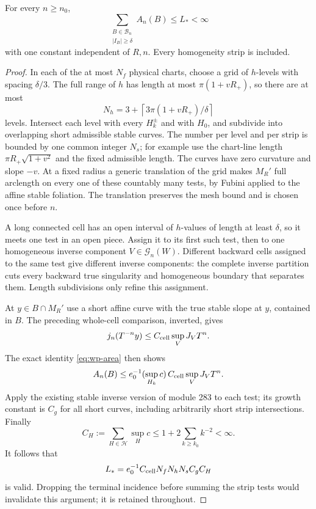 \begin{lemma}
\label{lem:wp-tests}
For every $n\ge n_0$,
\[
       \sum_{\substack{B\in\mathcal B_n\\ |I_B|\ge\delta}}A_n(B)
                          \le L_*<\infty
\]
with one constant independent of $R,n$.
Every homogeneity strip is included.
\end{lemma}

\begin{proof}
In each of the at most $N_f$ physical charts, choose a grid of
$h$-levels with spacing $\delta/3$.
The full range of $h$ has length at most $\pi(1+vR_+)$, so there
are at most
\[
 N_h=3+\left\lceil3\pi(1+vR_+)/\delta\right\rceil
\]
levels.  Intersect each level with every $H_k^\pm$ and with $H_0$,
and subdivide into overlapping short admissible stable curves.
The number per level and per strip is bounded by one common
integer $N_s$; for example use the chart-line length
$\pi R_+\sqrt{1+v^2}$ and the fixed admissible length.
The curves have zero curvature and slope $-v$.
At a fixed radius a generic translation of the grid makes $M_R'$
full arclength on every one of these countably many tests, by
Fubini applied to the affine stable foliation.
The translation preserves the mesh bound and is chosen once
before $n$.

A long connected cell has an open interval of $h$-values of length
at least $\delta$, so it meets one test in an open piece.
Assign it to its first such test, then to one homogeneous inverse
component $V\in\mathcal G_n(W)$.
Different backward cells assigned to the same test give different
inverse components: the complete inverse partition cuts every
backward true singularity and homogeneous boundary that separates
them.  Length subdivisions only refine this assignment.

At $y\in B\cap M_R'$ use a short affine curve with the true stable
slope at $y$, contained in $B$.  The preceding whole-cell comparison,
inverted, gives
\[
 j_n(T^{-n}y)\le
       C_{\rm cell}\sup_V J_VT^n.
\]
The exact identity \eqref{eq:wp-area} then shows
\[
 A_n(B)\le e_0^{-1}(\sup_{H_k}c)\,
                 C_{\rm cell}\sup_VJ_VT^n.
\]
Apply the existing stable inverse version of module 283 to each
test; its growth constant is $C_g$ for all short curves, including
arbitrarily short strip intersections.
Finally
\[
 C_H:=\sum_{H\in\mathcal H}\sup_H c
 \le1+2\sum_{k\ge k_0}k^{-2}<\infty.
\]
It follows that
\[
 L_*=e_0^{-1}C_{\rm cell}N_fN_hN_s C_g C_H
\]
is valid.  Dropping the terminal incidence before summing the strip
tests would invalidate this argument; it is retained throughout.
\end{proof}


